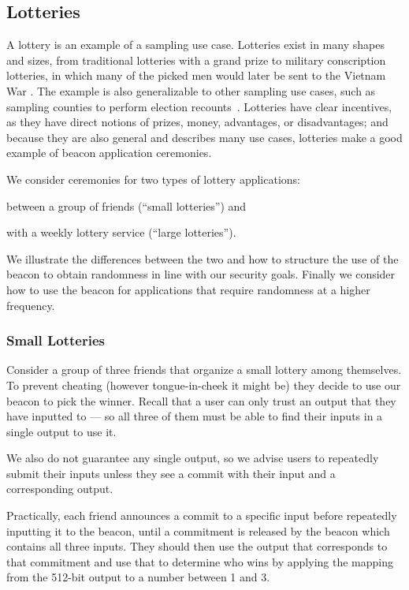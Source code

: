 \subsection{Lotteries}
A lottery is an example of a sampling use case.
Lotteries exist in many shapes and sizes, from traditional lotteries with a grand prize to military conscription lotteries, in which many of the picked men would later be sent to the Vietnam War \cite{starr1997nonrandom}. The example is also generalizable to other sampling use cases, such as sampling counties to perform election recounts~\cite{bushgore}. Lotteries have clear incentives, as they have direct notions of prizes, money, advantages, or disadvantages; and because they are also general and describes many use cases, lotteries make a good example of beacon application ceremonies.

We consider ceremonies for two types of lottery applications:
\begin{eletterate*}
\item between a group of friends (\enquote{small lotteries}) and
\item with a weekly lottery service (\enquote{large lotteries}).
\end{eletterate*}
We illustrate the differences between the two and how to structure the use of the beacon to obtain randomness in line with our security goals.
Finally we consider how to use the beacon for applications that require randomness at a higher frequency.

\subsubsection{Small Lotteries}
Consider a group of three friends that organize a small lottery among themselves.
To prevent cheating (however tongue-in-cheek it might be) they decide to use our beacon to pick the winner.
Recall that a user can only trust an output that they have inputted to --- so all three of them must be able to find their inputs in a single output to use it.

We also do not guarantee any single output, so we advise users to repeatedly submit their inputs unless they see a commit with their input and a corresponding output.

Practically, each friend announces a commit to a specific input before repeatedly inputting it to the beacon, until a commitment is released by the beacon which contains all three inputs.
They should then use the output that corresponds to that commitment and use that to determine who wins by applying the mapping from the 512-bit output to a number between 1 and 3.

